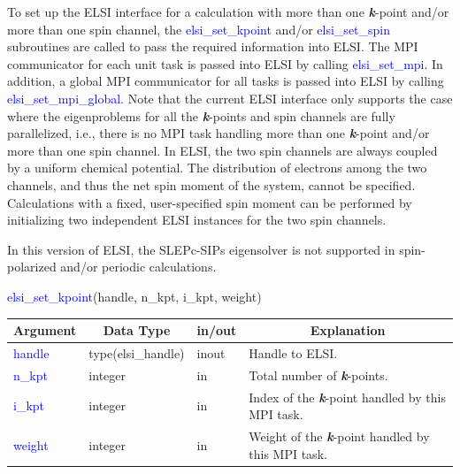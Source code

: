 \documentclass{report}
\begin{document}
To set up the ELSI interface for a calculation with more than one \textbf{\textit{k}}-point and/or more than one spin channel,  the \textcolor{blue}{elsi\_set\_kpoint} and/or \textcolor{blue}{elsi\_set\_spin} subroutines are called to pass the required information into ELSI.  The MPI communicator for each unit task is passed into ELSI by calling \textcolor{blue}{elsi\_set\_mpi}.  In addition, a global MPI communicator for all tasks is passed into ELSI by calling \textcolor{blue}{elsi\_set\_mpi\_global}.  Note that the current ELSI interface only supports the case where the eigenproblems for all the \textbf{\textit{k}}-points and spin channels are fully parallelized, i.e., there is no MPI task handling more than one \textbf{\textit{k}}-point and/or more than one spin channel.  In ELSI, the two spin channels are always coupled by a uniform chemical potential.  The distribution of electrons among the two channels, and thus the net spin moment of the system, cannot be specified.  Calculations with a fixed, user-specified spin moment can be performed by initializing two independent ELSI instances for the two spin channels.

In this version of ELSI, the SLEPc-SIPs eigensolver is not supported in spin-polarized and/or periodic calculations.
\begin{labeling}{\hspace{6cm}}
\item [\hspace{0.3cm} \textcolor{blue}{elsi\_set\_kpoint}(handle, n\_kpt, i\_kpt, weight)]
\end{labeling}

\begin{tabular}[]{|p{30mm}|p{30mm}|p{15mm}|p{90mm}|}
\hline
\multicolumn{1}{|c|}{\textbf{Argument}} & \multicolumn{1}{c|}{\textbf{Data Type}} & \multicolumn{1}{c|}{\textbf{in/out}} & \multicolumn{1}{c|}{\textbf{Explanation}}\\
\hline
\textcolor{blue}{handle} & type(elsi\_handle) & inout & Handle to ELSI.\\
\hline
\textcolor{blue}{n\_kpt} & integer            & in    & Total number of \textbf{\textit{k}}-points.\\
\hline
\textcolor{blue}{i\_kpt} & integer            & in    & Index of the \textbf{\textit{k}}-point handled by this MPI task.\\
\hline
\textcolor{blue}{weight} & integer            & in    & Weight of the \textbf{\textit{k}}-point handled by this MPI task.\\
\hline
\end{tabular}
\end{document}
